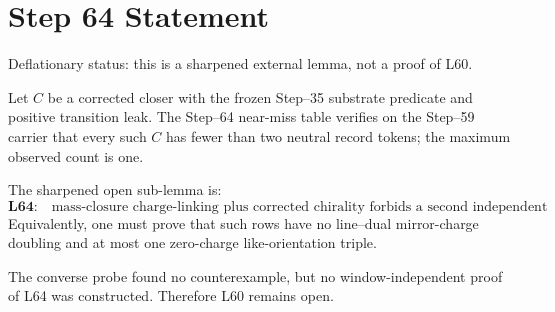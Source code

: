 \documentclass[11pt]{article}
\begin{document}
\section*{Step 64 Statement}
Deflationary status: this is a sharpened external lemma, not a proof of L60.

Let \(C\) be a corrected closer with the frozen Step--35 substrate predicate and positive transition leak. The Step--64 near-miss table verifies on the Step--59 carrier that every such \(C\) has fewer than two neutral record tokens; the maximum observed count is one.

The sharpened open sub-lemma is:
\[
\textbf{L64:}\quad
\text{mass-closure charge-linking plus corrected chirality forbids a second independent neutral record channel in leak-positive substrate closers.}
\]
Equivalently, one must prove that such rows have no line--dual mirror-charge doubling and at most one zero-charge like-orientation triple.

The converse probe found no counterexample, but no window-independent proof of L64 was constructed. Therefore L60 remains open.
\end{document}
